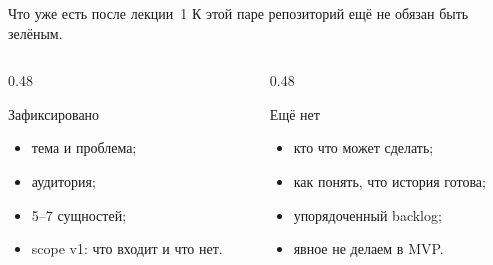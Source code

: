\begin{frame}{Что уже есть после лекции~1}
  К этой паре репозиторий ещё не обязан быть зелёным.

  \medskip
  \begin{columns}[T]
    \begin{column}{0.48\textwidth}
      \begin{block}{Зафиксировано}
        \begin{itemize}
          \item тема и проблема;
          \item аудитория;
          \item 5--7 сущностей;
          \item scope v1: что входит и что нет.
        \end{itemize}
      \end{block}
    \end{column}
    \begin{column}{0.48\textwidth}
      \begin{block}{Ещё нет}
        \begin{itemize}
          \item кто что может сделать;
          \item как понять, что история готова;
          \item упорядоченный backlog;
          \item явное \flqq не делаем в MVP\frqq.
        \end{itemize}
      \end{block}
    \end{column}
  \end{columns}
\end{frame}
